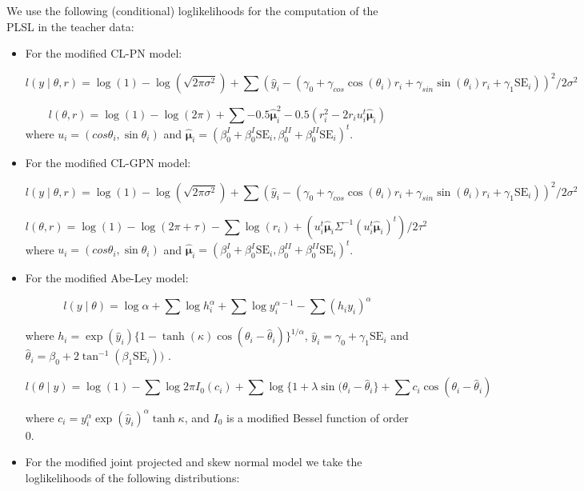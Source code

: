 \documentclass[12pt,]{article}
\begin{document}
\indent We use the following (conditional) loglikelihoods for the
computation of the PLSL in the teacher data:

\begin{itemize}
\item For the modified CL-PN model:

$$l(y \mid \theta, r) = \log(1) - \log(\sqrt{2\pi\sigma^2}) + \sum(\hat{y}_i-(\gamma_0 + \gamma_{cos}\cos(\theta_i)r_i +
\gamma_{sin}\sin(\theta_i)r_i + \gamma_1\text{SE}_i))^2/2\sigma^2$$

$$l(\theta, r) = \log(1) - \log(2\pi) + \sum -0.5\hat{\boldsymbol{\mu}}_i^2 - 0.5(r_i^2 - 2r_iu_i^t\hat{\boldsymbol{\mu}}_i)$$
where $u_i = (cos\theta_i, \sin \theta_i)$ and $\hat{\boldsymbol{\mu}}_i = (\beta_0^{I} + \beta_0^{I}\text{SE}_i, \beta_0^{II} + \beta_0^{II}\text{SE}_i)^t$.

\item For the modified CL-GPN model:

$$l(y \mid \theta, r) = \log(1) - \log(\sqrt{2\pi\sigma^2}) + \sum(\hat{y}_i-(\gamma_0 + \gamma_{cos}\cos(\theta_i)r_i +
\gamma_{sin}\sin(\theta_i)r_i + \gamma_1\text{SE}_i))^2/2\sigma^2$$

$$l(\theta, r) =  \log(1) - \log(2\pi+\tau) - \sum \log(r_i) + (u_i^t\hat{\boldsymbol{\mu}}_i\Sigma^{-1}(u_i^t\hat{\boldsymbol{\mu}}_i)^t)/2\tau^2$$
where $u_i = (cos\theta_i, \sin \theta_i)$ and $\hat{\boldsymbol{\mu}}_i = (\beta_0^{I} + \beta_0^{I}\text{SE}_i, \beta_0^{II} + \beta_0^{II}\text{SE}_i)^t$.


\item For the modified Abe-Ley model:


$$l(y \mid \theta) = \log\alpha + \sum\log h_i^\alpha + \sum\log y_i^{\alpha - 1} - \sum(h_iy_i)^\alpha$$

where $h_i = \exp(\hat{y}_i)\{1-\tanh(\kappa)\cos(\theta_i - \hat{\theta}_i)\}^{1/\alpha}$, $\hat{y}_i = \gamma_0 + \gamma_1\text{SE}_i$ and $\hat{\theta}_i = \beta_0 +  2\tan^{-1}(\beta_1\text{SE}_i))$ .

$$l(\theta \mid y) = \log(1) - \sum\log 2\pi I_0(c_i) + \sum\log\{1 + \lambda \sin(\theta_i - \hat{\theta}_i\} + \sum c_i\cos(\theta_i - \hat{\theta}_i)$$

where $c_i = y_i^{\alpha}\exp(\hat{y}_i)^{\alpha}\tanh\kappa$, and $I_{0}$ is a modified Bessel function of order $0$.


\item For the modified joint projected and skew normal model we take the loglikelihoods of the following distributions:


\end{itemize}
\end{document}
